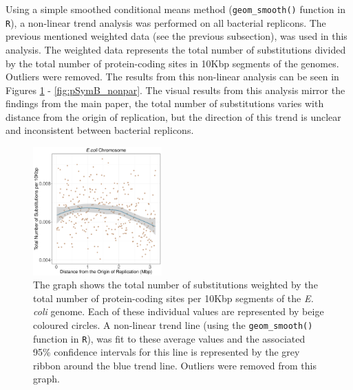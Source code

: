 \documentclass[11pt]{article}
\newcommand{\ecol}{\textit{E.\,coli}\xspace}
\providecommand{\DIFaddbegin}{} %
\providecommand{\DIFdelbegin}{} %
\providecommand{\DIFdelend}{} %
\providecommand{\DIFaddbeginFL}{} %
\providecommand{\DIFaddendFL}{} %
\providecommand{\DIFdelbeginFL}{} %
\providecommand{\DIFdelendFL}{} %
\begin{document}
Using a simple smoothed conditional means method (\texttt{geom\_smooth()} function in \texttt{R}), a non-linear trend analysis was performed on all bacterial replicons.
The previous mentioned weighted data (see the previous subsection), was used in this analysis.
The weighted data represents the total number of substitutions divided by the total number of protein-coding sites in 10Kbp segments of the genomes.
Outliers were removed.
The results from this non-linear analysis can be seen in Figures \ref{fig:ecoli_nonpar} - \ref{fig:pSymB_nonpar}.
The visual results from this analysis mirror the findings from the main paper, the total number of substitutions varies with distance from the origin of replication, but the direction of this trend is unclear and inconsistent between bacterial replicons.



\DIFdelbegin %
\DIFdelend \DIFaddbegin \begin{figure}[H]
	\DIFaddendFL \begin{center}
		\DIFdelbeginFL %
\DIFdelendFL \DIFaddbeginFL \includegraphics[width=0.44\textwidth]{./figs/ecoli_10KB_weighted_subs_nonpar_23Sep20.pdf}
		\DIFaddendFL \caption{\label{fig:ecoli_nonpar}The graph shows the total number of substitutions weighted by the total number of protein-coding sites per 10Kbp segments of the \ecol genome. Each of these individual values are represented by beige coloured circles. A non-linear trend line (using the \texttt{geom\_smooth()} function in \texttt{R}), was fit to these average values and the associated 95\% confidence intervals for this line is represented by the grey ribbon around the blue trend line. Outliers were removed from this graph.}
	\end{center}
\end{figure}
\end{document}
